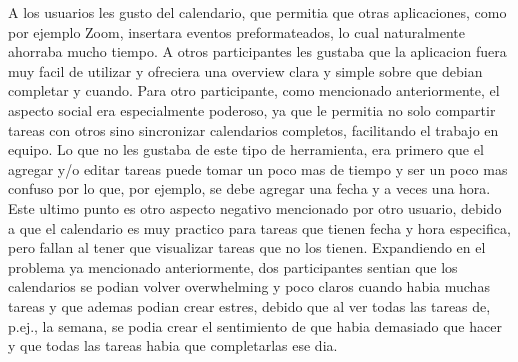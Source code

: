 A los usuarios les gusto del calendario, que permitia que otras aplicaciones, como por ejemplo Zoom, insertara eventos preformateados, lo cual naturalmente ahorraba mucho tiempo. A otros participantes les gustaba que la aplicacion fuera muy facil de utilizar y ofreciera una overview clara y simple sobre que debian completar y cuando. Para otro participante, como mencionado anteriormente, el aspecto social era especialmente poderoso, ya que le permitia no solo compartir tareas con otros sino sincronizar calendarios completos, facilitando el trabajo en equipo. Lo que no les gustaba de este tipo de herramienta, era primero que el agregar y/o editar tareas puede tomar un poco mas de tiempo y ser un poco mas confuso por lo que, por ejemplo, se debe agregar una fecha y a veces una hora. Este ultimo punto es otro aspecto negativo mencionado por otro usuario, debido a que el calendario es muy practico para tareas que tienen fecha y hora especifica, pero fallan al tener que visualizar tareas que no los tienen. Expandiendo en el problema ya mencionado anteriormente, dos participantes sentian que los calendarios se podian volver overwhelming y poco claros cuando habia muchas tareas y que ademas podian crear estres, debido que al ver todas las tareas de, p.ej., la semana, se podia crear el sentimiento de que habia demasiado que hacer y que todas las tareas habia que completarlas ese dia.  

